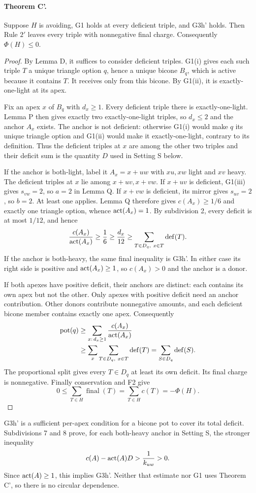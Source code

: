 \paragraph{Theorem C'.} Suppose $H$ is avoiding, G1 holds at every deficient triple, and G3h' holds. Then Rule $2'$ leaves every triple with nonnegative final charge. Consequently $\Phi(H)\leq0$.
\begin{proof}
By Lemma D, it suffices to consider deficient triples. G1(i) gives each such triple $T$ a unique triangle option $q$, hence a unique bicone $B_q$, which is active because it contains $T$. It receives only from this bicone. By G1(ii), it is exactly-one-light at its apex.

Fix an apex $x$ of $B_q$ with $d_x\geq1$. Every deficient triple there is exactly-one-light. Lemma P then gives exactly two exactly-one-light triples, so $d_x\leq2$ and the anchor $A_x$ exists. The anchor is not deficient: otherwise G1(i) would make $q$ its unique triangle option and G1(ii) would make it exactly-one-light, contrary to its definition. Thus the deficient triples at $x$ are among the other two triples and their deficit sum is the quantity $D$ used in Setting S below.

If the anchor is both-light, label it $A_x=x+uw$ with $xu,xw$ light and $xv$ heavy. The deficient triples at $x$ lie among $x+uv,x+vw$. If $x+uv$ is deficient, G1(iii) gives $s_{vw}=2$, so $a=2$ in Lemma Q. If $x+vw$ is deficient, its mirror gives $s_{uv}=2$, so $b=2$. At least one applies. Lemma Q therefore gives $c(A_x)\geq1/6$ and exactly one triangle option, whence $\operatorname{act}(A_x)=1$. By subdivision 2, every deficit is at most $1/12$, and hence
\[
 \frac{c(A_x)}{\operatorname{act}(A_x)}\geq\frac16\geq\frac{d_x}{12}
 \geq\sum_{T\in D_q,\ x\in T}\operatorname{def}(T).
\]
If the anchor is both-heavy, the same final inequality is G3h'. In either case its right side is positive and $\operatorname{act}(A_x)\geq1$, so $c(A_x)>0$ and the anchor is a donor.

If both apexes have positive deficit, their anchors are distinct: each contains its own apex but not the other. Only apexes with positive deficit need an anchor contribution. Other donors contribute nonnegative amounts, and each deficient bicone member contains exactly one apex. Consequently
\begin{align*}
 \operatorname{pot}(q)
 &\geq\sum_{x:\,d_x\geq1}\frac{c(A_x)}{\operatorname{act}(A_x)}\\
 &\geq\sum_x\sum_{T\in D_q,\ x\in T}\operatorname{def}(T)
 =\sum_{S\in D_q}\operatorname{def}(S).
\end{align*}
The proportional split gives every $T\in D_q$ at least its own deficit. Its final charge is nonnegative. Finally conservation and F2 give
\[
 0\leq\sum_{T\in H}\operatorname{final}(T)=\sum_{T\in H}c(T)=-\Phi(H).
\]
\end{proof}
G3h' is a sufficient per-apex condition for a bicone pot to cover its total deficit. Subdivisions 7 and 8 prove, for each both-heavy anchor in Setting S, the stronger inequality
\[
 c(A)-\operatorname{act}(A)D>\frac1{k_{uw}}>0.
\]
Since $\operatorname{act}(A)\geq1$, this implies G3h'. Neither that estimate nor G1 uses Theorem C', so there is no circular dependence.
